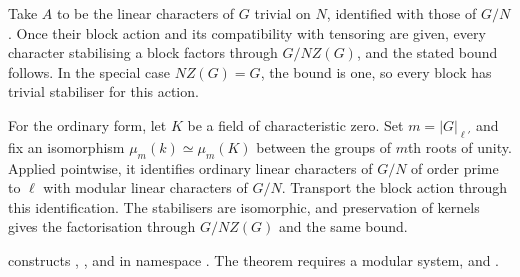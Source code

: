 \begin{example}
Take $A$ to be the linear characters of $G$ trivial on $N$, identified
with those of $G/N$. Once their block action and its compatibility with
tensoring are given, every character stabilising a block factors through
$G/NZ(G)$, and the stated bound follows. In the special case $NZ(G)=G$,
the bound is one, so every block has trivial stabiliser for this
action.
\end{example}

For the ordinary form, let $K$ be a field of characteristic zero.
Set $m=|G|_{\ell'}$ and fix an isomorphism
$\mu_m(k)\simeq\mu_m(K)$ between the groups of $m$th roots of unity.
Applied pointwise, it identifies ordinary linear characters of $G/N$
of order prime to $\ell$ with modular linear characters of $G/N$.
Transport the block action through this identification. The stabilisers
are isomorphic, and preservation of kernels gives the factorisation
through $G/NZ(G)$ and the same bound.

\begin{implementation}
 constructs
, , and
 in namespace
.
The theorem  requires a modular system,
 and
.
\end{implementation}
